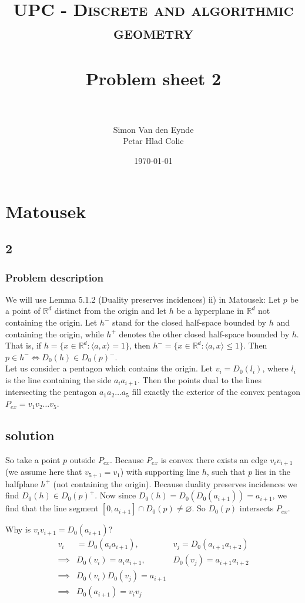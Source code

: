 \documentclass[paper=a4, fontsize=11pt]{scrartcl} %
\title{	
\normalfont \normalsize 
\textsc{UPC - Discrete and algorithmic geometry} \\ [25pt] %
\horrule{0.5pt} \\[0.4cm] %
\huge Problem sheet 2  \\ %
\horrule{2pt} \\[0.5cm] %
}
\author{Simon Van den Eynde \\ Petar Hlad Colic} %
\date{\normalsize\today} %
\theoremstyle{plain}
\begin{document}
\maketitle %

\section{Matousek}
\subsection{2}
\subsubsection{Problem description}
We will use Lemma 5.1.2 (Duality preserves incidences) ii) in Matousek: 
Let $p$ be a point of $\mathbb{R}^{d}$ distinct from the origin and let $h$ be a hyperplane in $\mathbb{R}^d$ not containing the origin. Let $h^-$ stand for the closed half-space bounded by $h$ and containing the origin, while $h^+$ denotes the other closed half-space bounded by $h$. That is, if $h=\{x\in\mathbb{R}^d: \langle a,x\rangle=1\}$, then $h^-=\{x\in\mathbb{R}^d: \langle a,x\rangle\leq1\}$.
Then $p\in h^- \iff D_0(h)\in D_0(p)^-$.\\

Let us consider a pentagon which contains the origin. Let $v_i = D_0(l_i)$, where $l_i$ is the line containing the side $a_ia_{i+1}$. Then the points dual to the lines intersecting the pentagon $a_1a_2\ldots a_5$ fill exactly the exterior of the convex pentagon $P_{ex} = v_1v_2\ldots v_5$.

\subsection{solution}
So take a point $p$ outside $P_{ex}$. Because $P_{ex}$ is convex there exists an edge $v_iv_{i+1}$ (we assume here that $v_{5+1}=v_1$) with supporting line $h$, such that $p$ lies in the halfplane $h^+$ (not containing the origin). Because duality preserves incidences we find $D_0(h)\in D_0(p)^+$. Now since $D_0(h)=D_0(D_0(a_{i+1}))=a_{i+1}$, we find that the line segment $[0,a_{i+1}]\cap D_0(p)\neq \varnothing$. So $D_0(p)$ intersects $P_{ex}$.

Why is $v_iv_{i+1}=D_0(a_{i+1})$?
\begin{align*}
v_i&=D_0(a_{i}a_{i+1}),& v_j=D_0(a_{i+1}a_{i+2})\\
\implies &D_0(v_i)=a_ia_{i+1},& D_0(v_j)=a_{i+1}a_{i+2}\\
\implies &D_0(v_i)D_0(v_j)=a_{i+1}\\
\implies &D_0(a_{i+1})=v_iv_j
\end{align*}
\end{document}
